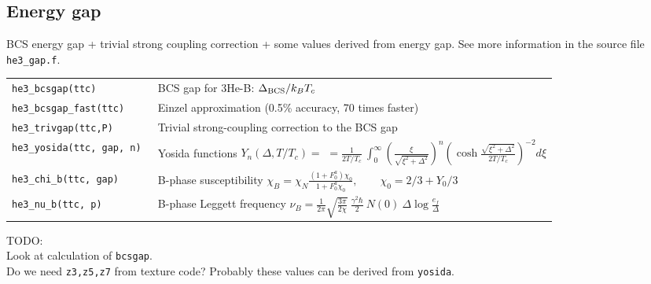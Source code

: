 \documentclass[a4paper]{article}
\begin{document}
{\small}

\eject
\subsection*{Energy gap}

BCS energy gap + trivial strong coupling correction + some values
derived from energy gap. See more information in the
source file {\tt he3\_gap.f}.

\medskip
\begin{tabular}{lp{9cm}}
\tt he3\_bcsgap(ttc)       & BCS gap for 3He-B: $\Delta_{\rm BCS}/ k_B T_c$\\
\tt he3\_bcsgap\_fast(ttc) & Einzel approximation (0.5\% accuracy, 70 times faster)\\
\tt he3\_trivgap(ttc,P) & Trivial strong-coupling correction to the BCS gap\\
\tt he3\_yosida(ttc, gap, n) & Yosida functions $Y_n(\Delta, T/T_c) =$\newline
$\displaystyle
= \frac{1}{2T/T_c}\ \int_0^\infty
  \left(\frac{\xi}{\sqrt{\xi^2+\Delta^2}}\right)^n
  \left(\cosh \frac{\sqrt{\xi^2+\Delta^2}}{2T/T_c}\right)^{-2}
  d\xi
$\\

\tt he3\_chi\_b(ttc, gap)    &B-phase susceptibility\newline
                             $\displaystyle \chi_B = \chi_N \frac{(1+F_0^a)\chi_0}{1+F_0^a\chi_0},
                             \qquad \chi_0 = 2/3 + Y_0/3$\\
\tt he3\_nu\_b(ttc, p)       &B-phase Leggett frequency\newline
                             $\displaystyle \nu_B =\frac{1}{2\pi}\sqrt{\frac{3\pi}{2\chi}}
                             \ \frac{\gamma^2\hbar}{2}\ N(0)\ \Delta \log\frac{e_f}{\Delta}  $\\
\end{tabular}
\medskip

\noindent TODO:\\
Look at calculation of {\tt bcsgap}.\\
Do we need {\tt z3,z5,z7} from texture code? Probably
these values can be derived from {\tt yosida}.\\
\end{document}
